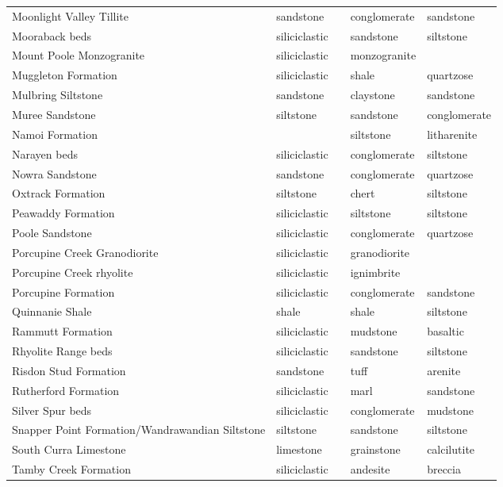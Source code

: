 \begin{tiny}
\begin{longtable}{p{5cm} l l l l}
    Moonlight Valley Tillite & sandstone &  & conglomerate & sandstone \\ 
    Mooraback beds & siliciclastic &  & sandstone & siltstone \\ 
    Mount Poole Monzogranite & siliciclastic &  & monzogranite &  \\ 
    Muggleton Formation & siliciclastic &  & shale & quartzose \\ 
    Mulbring Siltstone & sandstone &  & claystone & sandstone \\ 
    Muree Sandstone & siltstone &  & sandstone & conglomerate \\ 
    Namoi Formation &  &  & siltstone & litharenite \\ 
    Narayen beds & siliciclastic &  & conglomerate & siltstone \\ 
    Nowra Sandstone & sandstone &  & conglomerate & quartzose \\ 
    Oxtrack Formation & siltstone &  & chert & siltstone \\ 
    Peawaddy Formation & siliciclastic &  & siltstone & siltstone \\ 
    Poole Sandstone & siliciclastic &  & conglomerate & quartzose \\ 
    Porcupine Creek Granodiorite & siliciclastic &  & granodiorite &  \\ 
    Porcupine Creek rhyolite & siliciclastic &  & ignimbrite &  \\ 
    Porcupine Formation & siliciclastic &  & conglomerate & sandstone \\ 
    Quinnanie Shale & shale &  & shale & siltstone \\ 
    Rammutt Formation & siliciclastic &  & mudstone & basaltic \\ 
    Rhyolite Range beds & siliciclastic &  & sandstone & siltstone \\ 
    Risdon Stud Formation & sandstone &  & tuff & arenite \\ 
    Rutherford Formation & siliciclastic &  & marl & sandstone \\ 
    Silver Spur beds & siliciclastic &  & conglomerate & mudstone \\ 
    Snapper Point Formation/Wandrawandian Siltstone & siltstone &  & sandstone & siltstone \\ 
    South Curra Limestone & limestone &  & grainstone & calcilutite \\ 
    Tamby Creek Formation & siliciclastic &  & andesite & breccia \\ 

\end{longtable}
\end{tiny}
